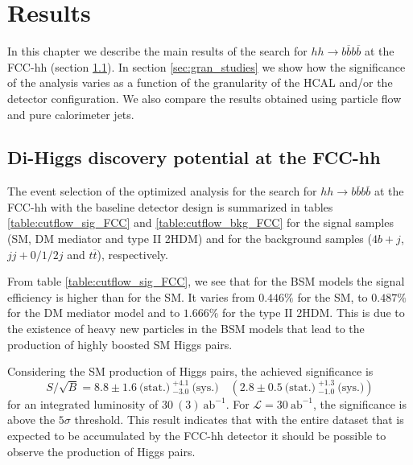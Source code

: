 
\chapter{Results}
\label{chapter:results}

In this chapter we describe the main results of the search for $hh\rightarrow b\overline{b}b\overline{b}$ at the FCC-hh (section \ref{sec:dihiggs_FCC}). In section \ref{sec:gran_studies} we show how the significance of the analysis varies as a function of the granularity of the HCAL and/or the detector configuration. We also compare the results obtained using particle flow and pure calorimeter jets.

\section{Di-Higgs discovery potential at the FCC-hh}
\label{sec:dihiggs_FCC}

The event selection of the optimized analysis for the search for $hh\rightarrow b\overline{b}b\overline{b}$ at the FCC-hh with the baseline detector design is summarized in tables \ref{table:cutflow_sig_FCC} and \ref{table:cutflow_bkg_FCC} for the signal samples (SM, DM mediator and type II 2HDM) and for the background samples ($4b+j$, $jj+0/1/2 j$ and $t\overline{t}$), respectively.

From table \ref{table:cutflow_sig_FCC}, we see that for the BSM models the signal efficiency is higher than for the SM. It varies from $0.446\%$ for the SM, to $0.487\%$ for the DM mediator model and to $1.666\%$ for the type II 2HDM. This is due to the existence of heavy new particles in the BSM models that lead to the production of highly boosted SM Higgs pairs.

Considering the SM production of Higgs pairs, the achieved significance is
\begin{equation}
	S/\sqrt{B}=8.8\pm 1.6~\text{(stat.)}~^{+4.1}_{-3.0}~\text{(sys.)}\quad \left(2.8\pm 0.5~\text{(stat.)}~^{+1.3}_{-1.0}~\text{(sys.)}\right)
\end{equation}
for an integrated luminosity of $30~(3)~\text{ab}^{-1}$. For $\mathcal{L}=30~\text{ab}^{-1}$, the significance is above the $5\sigma$ threshold. This result indicates that with the entire dataset that is expected to be accumulated by the FCC-hh detector it should be possible to observe the production of Higgs pairs.

